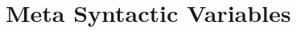 \documentclass[proposal.tex]{subfiles}
\begin{document}
\section{Meta Syntactic Variables}\label{sect:metasyntacticvariables}
\end{document}
